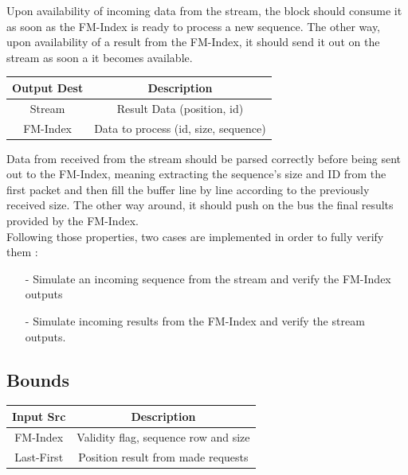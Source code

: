 Upon availability of incoming data from the stream, the block should consume it as soon as the FM-Index is ready to process a new sequence. The other way, upon availability of a result from the FM-Index, it should send it out on the stream as soon a it becomes available.
\begin{center}
\begin{tabular}{|c|c|}
\hline
  Output Dest   &  Description \\
  \hline
   Stream  & Result Data (position, id) \\
   FM-Index & Data to process (id, size, sequence) \\
   \hline
\end{tabular}
\end{center}
\vspace*{5mm}
Data from received from the stream should be parsed correctly before being sent out to the FM-Index, meaning extracting the sequence's size and ID from the first packet and then fill the buffer line by line according to the previously received size. The other way around, it should push on the bus the final results provided by the FM-Index. \\


Following those properties, two cases are implemented in order to fully verify them :
\begin{itemize}
    \item [-] Simulate an incoming sequence from the stream and verify the FM-Index outputs
    \item [-] Simulate incoming results from the FM-Index and verify the stream outputs.
\end{itemize}


\subsection{Bounds}
\vspace*{3mm}
\begin{center}
    \begin{tabular}{|c|c|}
\hline
  Input Src   &  Description \\
  \hline
   FM-Index  & Validity flag, sequence row and size \\
   Last-First & Position result from made requests \\
   \hline
\end{tabular}
\end{center}
\vspace*{5mm}

